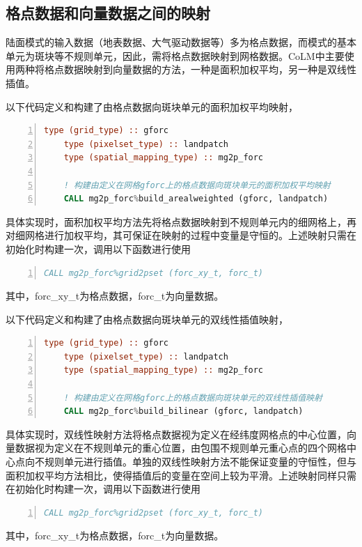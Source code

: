 \documentclass[a4paper,12pt,twoside]{article}
\begin{document}
\subsection{格点数据和向量数据之间的映射}

陆面模式的输入数据（地表数据、大气驱动数据等）多为格点数据，而模式的基本单元为斑块等不规则单元，因此，需将格点数据映射到网格数据。CoLM中主要使用两种将格点数据映射到向量数据的方法，一种是面积加权平均，另一种是双线性插值。

以下代码定义和构建了由格点数据向斑块单元的面积加权平均映射，
\begin{lstlisting}[language=fortran, basicstyle=\linespread{1.0}\footnotesize\ttfamily, commentstyle=\color{olive}, numbers=left, numberstyle=\tiny, xleftmargin=1.5em,xrightmargin=0em, aboveskip=1em]
    type (grid_type) :: gforc
    type (pixelset_type) :: landpatch
    type (spatial_mapping_type) :: mg2p_forc
    
    ! 构建由定义在网格gforc上的格点数据向斑块单元的面积加权平均映射
    CALL mg2p_forc%build_arealweighted (gforc, landpatch)    
\end{lstlisting}
具体实现时，面积加权平均方法先将格点数据映射到不规则单元内的细网格上，再对细网格进行加权平均，其可保证在映射的过程中变量是守恒的。上述映射只需在初始化时构建一次，调用以下函数进行使用
\begin{lstlisting}[language=fortran, basicstyle=\linespread{1.0}\footnotesize\ttfamily, commentstyle=\color{olive}, numbers=left, numberstyle=\tiny, xleftmargin=1.5em,xrightmargin=0em, aboveskip=1em]
    CALL mg2p_forc%grid2pset (forc_xy_t, forc_t) 
\end{lstlisting}
其中，forc\_xy\_t为格点数据，forc\_t为向量数据。

以下代码定义和构建了由格点数据向斑块单元的双线性插值映射，
\begin{lstlisting}[language=fortran, basicstyle=\linespread{1.0}\footnotesize\ttfamily, commentstyle=\color{olive}, numbers=left, numberstyle=\tiny, xleftmargin=1.5em,xrightmargin=0em, aboveskip=1em]
    type (grid_type) :: gforc
    type (pixelset_type) :: landpatch
    type (spatial_mapping_type) :: mg2p_forc
    
    ! 构建由定义在网格gforc上的格点数据向斑块单元的双线性插值映射
    CALL mg2p_forc%build_bilinear (gforc, landpatch)    
\end{lstlisting}
具体实现时，双线性映射方法将格点数据视为定义在经纬度网格点的中心位置，向量数据视为定义在不规则单元的重心位置，由包围不规则单元重心点的四个网格中心点向不规则单元进行插值。单独的双线性映射方法不能保证变量的守恒性，但与面积加权平均方法相比，使得插值后的变量在空间上较为平滑。上述映射同样只需在初始化时构建一次，调用以下函数进行使用
\begin{lstlisting}[language=fortran, basicstyle=\linespread{1.0}\footnotesize\ttfamily, commentstyle=\color{olive}, numbers=left, numberstyle=\tiny, xleftmargin=1.5em,xrightmargin=0em, aboveskip=1em]
    CALL mg2p_forc%grid2pset (forc_xy_t, forc_t) 
\end{lstlisting}
其中，forc\_xy\_t为格点数据，forc\_t为向量数据。
\end{document}
